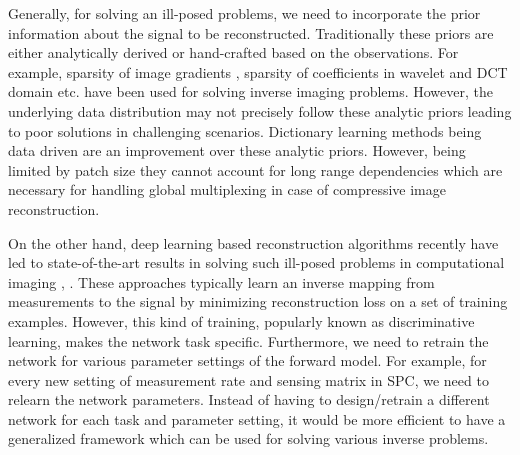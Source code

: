 \documentclass[journal,twoside]{IEEEtran}
\begin{document}
Generally, for solving an ill-posed problems, we need to incorporate the prior information about the signal to be reconstructed. Traditionally these priors are either analytically derived or hand-crafted based on the observations. For example, sparsity of image gradients \cite{rudin1992nonlinear}, sparsity of coefficients in wavelet and DCT domain \cite{portilla2003image} etc. have been used for solving inverse imaging problems. However, the underlying data distribution may not precisely follow these analytic priors leading to poor solutions in challenging scenarios. Dictionary learning \cite{aharon2006rm} methods being data driven are an improvement over these analytic priors. However, being limited by patch size they cannot account for long range dependencies which are necessary for handling global multiplexing in case of compressive image reconstruction.



On the other hand, deep learning based reconstruction algorithms recently have led to state-of-the-art results in solving such ill-posed problems in computational imaging \cite{kulkarni2016reconnet}, \cite{yao2017dr} \cite{metzler2017learned} \cite{sinha2017lensless}. These approaches typically learn an inverse mapping from measurements to the signal by minimizing reconstruction loss on a set of training examples. However, this kind of training, popularly known as discriminative learning, makes the network task specific. 
Furthermore, we need to retrain the network for various parameter settings of the forward model. For example, for every new setting of measurement rate and sensing matrix in SPC, we need to relearn the network parameters.  %
Instead of having to design/retrain a different network for each task and parameter setting, it would be more efficient to have a generalized framework which can be used for solving various inverse problems.
\end{document}
